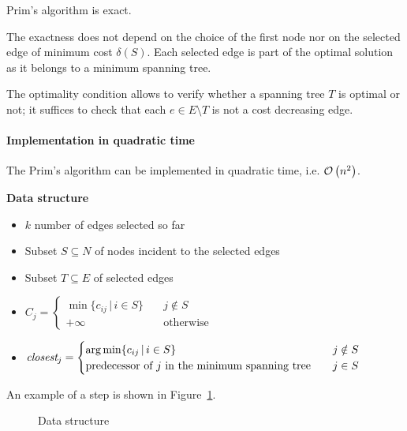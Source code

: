 \documentclass[english]{article}
\begin{document}
\begin{proposition}
  Prim's algorithm is exact.
\end{proposition}

The exactness does not depend on the choice of the first node nor on the selected edge of minimum cost \(\delta(S)\).
Each selected edge is part of the optimal solution as it belongs to a minimum spanning tree.

The optimality condition allows to verify whether a spanning tree \(T\) is optimal or not;
it suffices to check that each \(e \in E \setminus T\) is not a cost decreasing edge.

\paragraph{Implementation in quadratic time}

The Prim's algorithm can be implemented in quadratic time, i.e. \(\mathcal{O}\left(n^2\right)\).

\textbf{Data structure}
\begin{itemize}[itemsep=0.25ex]
  \item \(k\) number of edges selected so far
  \item Subset \(S \subseteq N\) of nodes incident to the selected edges
  \item Subset \(T \subseteq E\) of selected edges
  \item \(C_j = \begin{cases} \min \{c_{ij} \, | \, i \in S\} \quad &j \notin S \\ +\infty &\text{otherwise}\end{cases}\)
  \item \(\textit{closest}_j = \begin{cases} \operatorname*{arg\,min}\{c_{ij} \, | \, i \in S\}  & j \notin S \\ \text{predecessor of } j \text{ in the minimum spanning tree} \quad& j \in S \end{cases}\)
\end{itemize}

\bigskip
An example of a step is shown in Figure~\ref{fig:prim-quadratic-data-structure}.

\begin{figure}[htbp]
  \centering
  \bigskip
  \centering
  \caption{Data structure}
  \label{fig:prim-quadratic-data-structure}
  \bigskip
\end{figure}
\end{document}
